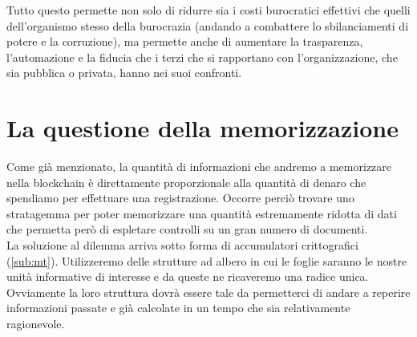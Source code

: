 Tutto questo permette non solo di ridurre sia i costi burocratici effettivi che quelli dell'organismo
stesso della burocrazia (andando a combattere lo sbilanciamenti di potere e la corruzione),
ma permette anche di aumentare la trasparenza, l'automazione e la fiducia che i terzi che si
rapportano con l'organizzazione, che sia pubblica o privata, hanno nei suoi confronti.

\section{La questione della memorizzazione}

Come già menzionato, la quantità di informazioni che andremo a memorizzare
nella blockchain è direttamente proporzionale alla quantità di denaro che
spendiamo per effettuare una registrazione.
Occorre perciò trovare uno stratagemma per poter memorizzare una quantità
estremamente ridotta di dati che permetta però di espletare controlli su un gran numero
di documenti. \\
La soluzione al dilemma arriva sotto forma di accumulatori crittografici (\autoref{sub:mt}).
Utilizzeremo delle strutture ad albero in cui le foglie saranno le nostre unità
informative di interesse e da queste ne ricaveremo una radice unica.
Ovviamente la loro struttura dovrà essere tale da permetterci di andare a reperire
informazioni passate e già calcolate in un tempo che sia relativamente ragionevole.

\newpage